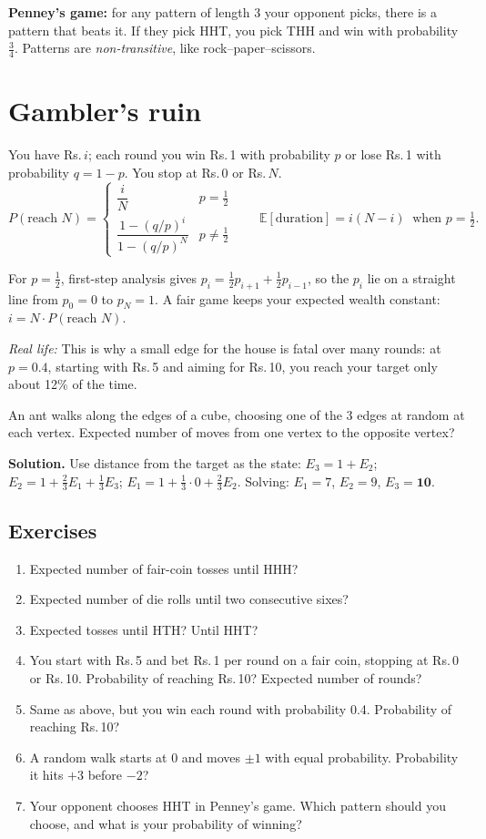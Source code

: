 \documentclass[11pt,a4paper,openany]{report}
\newenvironment{exercises}{\subsection*{Exercises \thechapter}\begin{enumerate}[label=\textbf{\thechapter.\arabic*},leftmargin=3.2em]}{\end{enumerate}}
\newcommand{\Rs}{Rs.\,}
\newcommand{\E}{\mathbb{E}}
\begin{document}
\textbf{Penney's game:} for any pattern of length 3 your opponent picks, there is a pattern that beats it. If they pick HHT, you pick THH and win with probability $\frac34$. Patterns are \emph{non-transitive}, like rock--paper--scissors.

\section{Gambler's ruin}
You have \Rs$i$; each round you win \Rs1 with probability $p$ or lose \Rs1 with probability $q=1-p$. You stop at \Rs0 or \Rs$N$.
\[P(\text{reach }N)=\begin{cases}\dfrac iN & p=\frac12\\[8pt] \dfrac{1-(q/p)^i}{1-(q/p)^N} & p\neq\frac12\end{cases}\qquad\E[\text{duration}]=i(N-i)\ \text{ when }p=\tfrac12.\]
\begin{why}
For $p=\frac12$, first-step analysis gives $p_i=\frac12p_{i+1}+\frac12p_{i-1}$, so the $p_i$ lie on a straight line from $p_0=0$ to $p_N=1$. A fair game keeps your expected wealth constant: $i=N\cdot P(\text{reach }N)$.
\end{why}

\textit{Real life:} This is why a small edge for the house is fatal over many rounds: at $p=0.4$, starting with \Rs5 and aiming for \Rs10, you reach your target only about 12\% of the time.

\begin{example}
An ant walks along the edges of a cube, choosing one of the 3 edges at random at each vertex. Expected number of moves from one vertex to the opposite vertex?

\textbf{Solution.} Use distance from the target as the state: $E_3=1+E_2$; $E_2=1+\frac23E_1+\frac13E_3$; $E_1=1+\frac13\cdot0+\frac23E_2$. Solving: $E_1=7$, $E_2=9$, $E_3=\mathbf{10}$.
\end{example}

\begin{exercises}
\item Expected number of fair-coin tosses until HHH?
\item Expected number of die rolls until two consecutive sixes?
\item Expected tosses until HTH? Until HHT?
\item You start with \Rs5 and bet \Rs1 per round on a fair coin, stopping at \Rs0 or \Rs10. Probability of reaching \Rs10? Expected number of rounds?
\item Same as above, but you win each round with probability 0.4. Probability of reaching \Rs10?
\item A random walk starts at 0 and moves $\pm1$ with equal probability. Probability it hits $+3$ before $-2$?
\item Your opponent chooses HHT in Penney's game. Which pattern should you choose, and what is your probability of winning?
\end{exercises}
\end{document}
